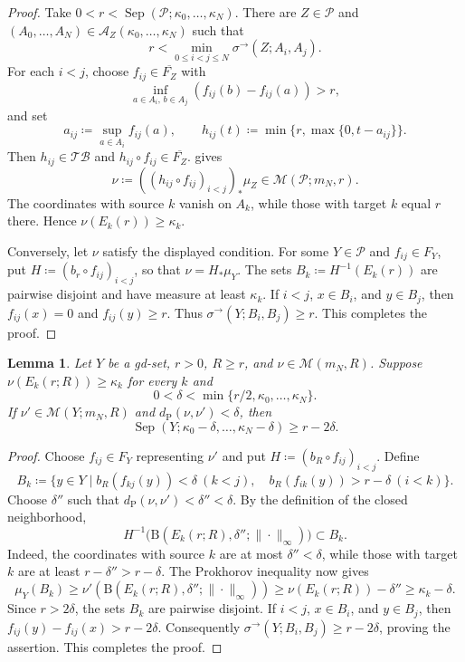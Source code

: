\documentclass{amsart}
\theoremstyle{plain}
\newtheorem{lemma}[theorem]{Lemma}
\theoremstyle{definition}
\theoremstyle{remark}
\newcommand{\M}{\mathcal{M}}
\newcommand{\TB}{\mathcal{TB}}
\newcommand{\dpr}{d_{\operatorname{P}}}
\begin{document}
\begin{proof}
Take $0<r<\operatorname{Sep}(\mathcal P;\kappa_0,\ldots,\kappa_N)$.
There are $Z\in\mathcal P$ and
$(A_0,\ldots,A_N)\in\mathcal A_Z(\kappa_0,\ldots,\kappa_N)$ such that
\[
r<\min_{0\leq i<j\leq N}\sigma^{\to}(Z;A_i,A_j).
\]
For each $i<j$, choose $f_{ij}\in\overline{F_Z}$ with
\[
\inf_{a\in A_i,\,b\in A_j}(f_{ij}(b)-f_{ij}(a))>r,
\]
and set
\[ a_{ij}\coloneqq\sup_{a\in A_i}f_{ij}(a),\qquad h_{ij}(t)\coloneqq\min\{r,\max\{0,t-a_{ij}\}\}. \]
Then $h_{ij}\in\TB$ and $h_{ij}\circ f_{ij}\in\overline{F_Z}$.
 gives
\[ \nu\coloneqq((h_{ij}\circ f_{ij})_{i<j})_*\mu_Z \in\M(\mathcal P;m_N,r). \]
The coordinates with source $k$ vanish on $A_k$, while those with target
$k$ equal $r$ there.  Hence $\nu(E_k(r))\geq\kappa_k$.

Conversely, let $\nu$ satisfy the displayed condition.  For some
$Y\in\mathcal P$ and $f_{ij}\in F_Y$, put
$H\coloneqq(b_r\circ f_{ij})_{i<j}$, so that $\nu=H_*\mu_Y$.  The sets
$B_k\coloneqq H^{-1}(E_k(r))$ are pairwise disjoint and have measure at
least $\kappa_k$.  If $i<j$, $x\in B_i$, and $y\in B_j$, then
$f_{ij}(x)=0$ and $f_{ij}(y)\geq r$.  Thus
$\sigma^{\to}(Y;B_i,B_j)\geq r$.  This completes the proof.
\end{proof}

\begin{lemma}
\label{lem:multi-directed-separation-prokhorov-control}
Let $Y$ be a gd-set, $r>0$, $R\geq r$, and $\nu\in\M(m_N,R)$.  Suppose
$\nu(E_k(r;R))\geq\kappa_k$ for every $k$ and
\[
0<\delta<\min\{r/2,\kappa_0,\ldots,\kappa_N\}.
\]
If $\nu'\in\M(Y;m_N,R)$ and $\dpr(\nu,\nu')<\delta$, then
\[ \operatorname{Sep}(Y;\kappa_0-\delta,\ldots,\kappa_N-\delta) \geq r-2\delta. \]
\end{lemma}

\begin{proof}
Choose $f_{ij}\in F_Y$ representing $\nu'$ and put
$H\coloneqq(b_R\circ f_{ij})_{i<j}$.  Define
\[ B_k\coloneqq\{y\in Y\mid b_R(f_{kj}(y))<\delta\ (k<j),\quad b_R(f_{ik}(y))>r-\delta\ (i<k)\}. \]
Choose $\delta''$ such that
$\dpr(\nu,\nu')<\delta''<\delta$.  By the definition of the closed
neighborhood,
\[
H^{-1}\bigl(\mathrm B(E_k(r;R),\delta'';\|\cdot\|_\infty)\bigr)\subset B_k.
\]
Indeed, the coordinates with source $k$ are at most
$\delta''<\delta$, while those with target $k$ are at least
$r-\delta''>r-\delta$.  The Prokhorov inequality now gives
\[
\mu_Y(B_k)\geq\nu'(\mathrm B(E_k(r;R),\delta'';\|\cdot\|_\infty))
\geq\nu(E_k(r;R))-\delta''\geq\kappa_k-\delta.
\]
Since $r>2\delta$, the sets $B_k$ are pairwise disjoint.  If $i<j$,
$x\in B_i$, and $y\in B_j$, then
$f_{ij}(y)-f_{ij}(x)>r-2\delta$.  Consequently
$\sigma^{\to}(Y;B_i,B_j)\geq r-2\delta$, proving the assertion.  This
completes the proof.
\end{proof}
\end{document}
